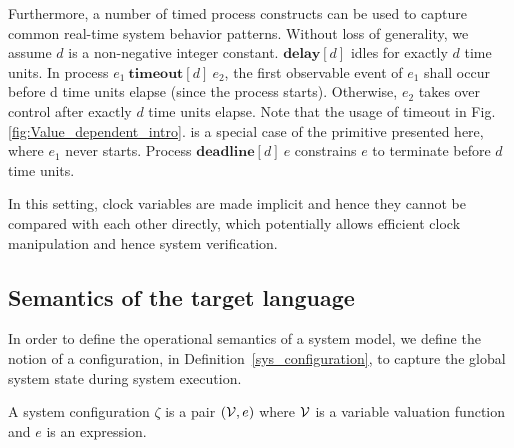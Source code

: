 \documentclass[acmsmall,10pt,review]{acmart}
\newcommand{\env}{\code{\mathcal{V}}}
\newcommand{\code}[1]{{\tt{\ensuremath{\m{#1}}}}}
\newcommand{\m}{\mathit}
\newcommand\figref[1]{Fig. \textcolor{black}{\ref{#1}}.}
\newcommand\defref[1]{Definition~\textcolor{blue}{\ref{#1}}}
\begin{document}
{Furthermore, a number of timed process constructs can be used to capture common 
real-time system behavior patterns. Without loss of generality, we 
assume \code{d} is a non-negative integer constant.  
$\textbf{delay} [d]$ idles for exactly $d$ 
time units.
 In process $e_1\ \textbf{timeout} [d]\ e_2$, the first observable event of 
$e_1$ shall occur before d time units elapse (since the process starts). 
Otherwise, $e_2$ takes over control after exactly $d$ time units elapse. 
Note that the usage of timeout in \figref{fig:Value_dependent_intro} is a 
special case of the primitive presented here, where \code{e_1} never starts. 
Process $\textbf{deadline} [d]\ e$ constrains $e$ to terminate before $d$ time units. 


In this setting, clock variables are 
made implicit and hence they cannot be compared with each other 
directly, which potentially allows efficient clock manipulation and 
hence system verification.


%

\subsection{Semantics of the target language}
\label{subsec:Targetlanguage_Semantics}

In order to define the operational semantics of a system model, 
we define the notion of a configuration, in \defref{sys_configuration}, to capture 
the global system state during system execution.

\begin{definition}\label{sys_configuration}
A system configuration \code{\zeta} is a pair $(\env , e)$ where $\env$ is a variable valuation function and $e$ is an expression.
\end{definition}

}
\end{document}
